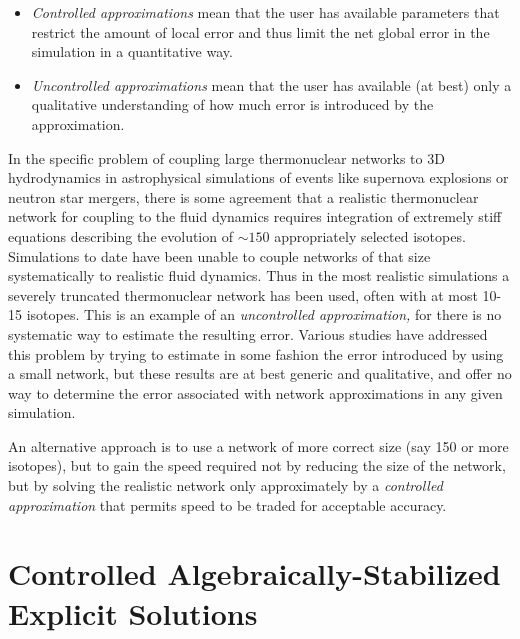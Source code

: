 \documentclass[11pt]{article}
\begin{document}
\begin{itemize}
 \item 
 {\em Controlled approximations}
  mean that the user has 
available parameters that restrict the amount of local error and thus limit the 
net 
global error in the simulation in a quantitative way.
\item
{\em Uncontrolled approximations} mean that the user has available (at 
best) only a qualitative understanding of how much error is introduced by the 
approximation.
\end{itemize}

\noindent
In the specific problem of coupling large thermonuclear networks to 3D 
hydrodynamics in astrophysical simulations of events like supernova explosions 
or neutron star mergers, there is some agreement that a realistic thermonuclear 
network for coupling to the fluid dynamics requires integration of 
extremely stiff equations describing the evolution of $\sim 150$ appropriately 
selected isotopes. Simulations to date have been unable to couple 
networks of that size  systematically to realistic fluid dynamics. Thus in the 
most realistic simulations a severely truncated thermonuclear network has 
been used, often with at most 10-15 isotopes. This is an example of an 
{\em uncontrolled approximation,} for there is no systematic way to estimate 
the resulting error.  Various studies have addressed this problem by trying to 
estimate in some fashion the error introduced by using a small network, but 
these results are at best generic and qualitative, and offer no way to 
determine the error associated with network approximations in any given 
simulation. 

An alternative approach is to use a network of more correct size (say 150 or 
more isotopes), but to gain the speed required not by reducing the size of 
the network, but by solving the realistic network only approximately by 
 a {\em controlled approximation} that permits speed to be traded for 
acceptable accuracy.  


\section{Controlled Algebraically-Stabilized Explicit Solutions}
\end{document}
